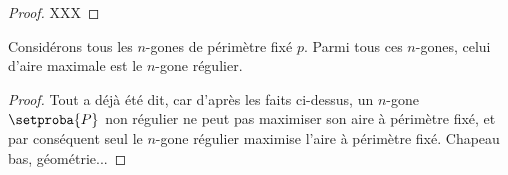 \begin{proof}
	XXX
\end{proof}




\begin{fact}
	Considérons tous les $n$-gones de périmètre fixé $p$. Parmi tous ces $n$-gones, celui d'aire maximale est le $n$-gone régulier.
\end{fact}


\begin{proof}
	Tout a déjà été dit, car d'après les faits ci-dessus, un $n$-gone $\setproba{P}$ non régulier ne peut pas maximiser son aire à périmètre fixé, et par conséquent seul le $n$-gone régulier maximise l'aire à périmètre fixé. Chapeau bas, géométrie...
\end{proof}
